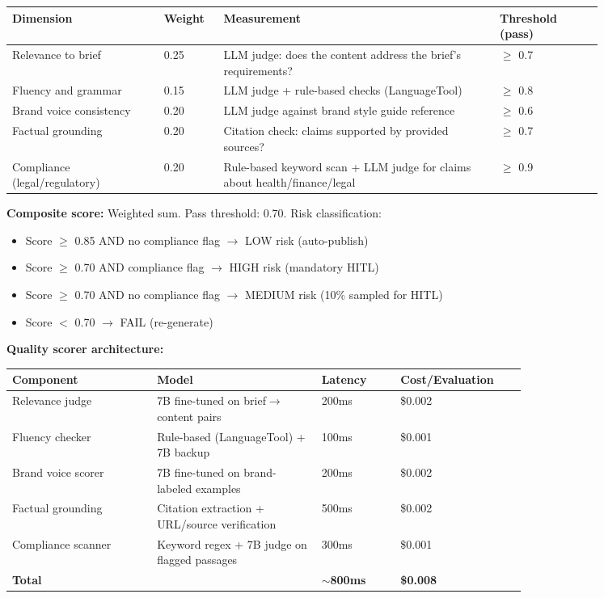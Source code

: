 \begin{tabular}{|p{0.22\linewidth}|p{0.08\linewidth}|p{0.40\linewidth}|p{0.15\linewidth}|}
\hline
\textbf{Dimension} & \textbf{Weight} & \textbf{Measurement} & \textbf{Threshold (pass)} \\
\hline
Relevance to brief & 0.25 & LLM judge: does the content address the brief's requirements? & $\geq$ 0.7 \\
\hline
Fluency and grammar & 0.15 & LLM judge + rule-based checks (LanguageTool) & $\geq$ 0.8 \\
\hline
Brand voice consistency & 0.20 & LLM judge against brand style guide reference & $\geq$ 0.6 \\
\hline
Factual grounding & 0.20 & Citation check: claims supported by provided sources? & $\geq$ 0.7 \\
\hline
Compliance (legal/regulatory) & 0.20 & Rule-based keyword scan + LLM judge for claims about health/finance/legal & $\geq$ 0.9 \\
\hline
\end{tabular}

\textbf{Composite score:} Weighted sum. Pass threshold: 0.70. Risk classification:
\begin{itemize}
  \item Score $\geq$ 0.85 AND no compliance flag $\rightarrow$ LOW risk (auto-publish)
  \item Score $\geq$ 0.70 AND compliance flag $\rightarrow$ HIGH risk (mandatory HITL)
  \item Score $\geq$ 0.70 AND no compliance flag $\rightarrow$ MEDIUM risk (10\% sampled for HITL)
  \item Score $<$ 0.70 $\rightarrow$ FAIL (re-generate)
\end{itemize}

\textbf{Quality scorer architecture:}

\begin{tabular}{|p{0.22\linewidth}|p{0.25\linewidth}|p{0.12\linewidth}|p{0.15\linewidth}|}
\hline
\textbf{Component} & \textbf{Model} & \textbf{Latency} & \textbf{Cost/Evaluation} \\
\hline
Relevance judge & 7B fine-tuned on brief$\rightarrow$content pairs & 200ms & \$0.002 \\
\hline
Fluency checker & Rule-based (LanguageTool) + 7B backup & 100ms & \$0.001 \\
\hline
Brand voice scorer & 7B fine-tuned on brand-labeled examples & 200ms & \$0.002 \\
\hline
Factual grounding & Citation extraction + URL/source verification & 500ms & \$0.002 \\
\hline
Compliance scanner & Keyword regex + 7B judge on flagged passages & 300ms & \$0.001 \\
\hline
\textbf{Total} & & \textbf{$\sim$800ms} & \textbf{\$0.008} \\
\hline
\end{tabular}

